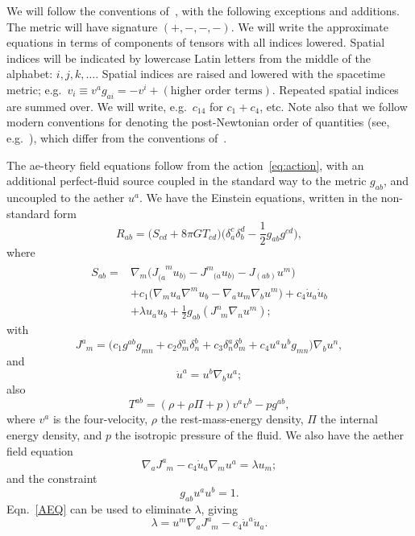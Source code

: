 \documentclass[aps,prd,preprint,amsmath,amssymb]{revtex4}
\def\beq{\begin{equation}}
\def\eeq{\end{equation}}
\def\ph{\phantom}
\def\half{\frac{1}{2}}
\begin{document}
We will follow the conventions of~\cite{wald}, with the following
exceptions and additions.  The metric will have signature 
$({+},{-},{-},{-})$.
We will write the approximate equations in terms of components of
tensors with all indices lowered. Spatial indices will be
indicated by lowercase Latin letters from the middle of the
alphabet: ${i,j,k,\dots}$.  Spatial indices are raised and lowered
with the spacetime metric; e.g.~$v_i \equiv v^a g_{ai} = -v^i +
(\text{higher order terms})$. Repeated spatial indices are summed
over.  We will write, e.g.~$c_{14}$ for $c_1 + c_4$, etc.  Note also 
that we follow modern conventions for denoting the post-Newtonian
order of quantities (see, e.g.~\cite{WillReview}), which differ from the 
conventions of~\cite{WillBook}.

The ae-theory field equations follow from the
action~\eqref{eq:action}, with an additional perfect-fluid source
coupled in the standard way to the metric $g_{ab}$, and uncoupled
to the aether $u^a$. We have the Einstein equations, written in
the non-standard form
%
\beq\label{EEQ}
    R_{ab} = \big(S_{cd} + 8\pi G T_{cd}\big)
            \big(\delta^c_a \delta^d_b - \half g_{ab}g^{cd}\big),
\eeq
%
where
%
\beq\begin{split}
    S_{ab} = &\nabla_m\bigl(J_{(a}^{\ph{(a}m}u_{b)} -
        J^m_{\ph{m}(a} u_{b)} - J_{(ab)}u^m\bigr)\\&
        +c_1\bigl(\nabla_m u_a\nabla^mu_b
            - \nabla_a u_m\nabla_b u^m\bigr)
        +c_4{\dot u}_a {\dot u}_b\\
        &+\lambda u_a u_b +\frac{1}{2}g_{ab}
            (J^n_{\ph{a}m}\nabla_n u^m);
\end{split}\eeq
%
with
%
\beq
    J^a_{\phantom{a}m} = \big(c_1g^{ab}g_{mn}
        +c_2\delta^a_m\delta^b_n + c_3\delta^a_n\delta^b_m
        +c_4 u^a u^b g_{mn}\big)
        \nabla_b u^n,
\eeq
%
and
%
\beq
    {\dot u}^a = u^b\nabla_b u^a;
\eeq
%
also
%
\beq
    T^{ab} = (\rho + \rho\Pi + p)v^a v^b - p g^{ab},
\eeq
%
where $v^a$ is the four-velocity, $\rho$ the rest-mass-energy
density, $\Pi$ the internal energy density, and $p$ the isotropic
pressure of the fluid.  We also have the aether field equation
%
\beq\label{AEQ}
    \nabla_a J^a_{\phantom{a}m}-c_4 {\dot u}_a \nabla_m u^a
        = \lambda u_m;
\eeq
%
and the constraint
%
\beq\label{CON}
    g_{ab}u^a u^b = 1.
\eeq
%
Eqn.~\eqref{AEQ} can be used to eliminate $\lambda$, giving
%
\beq
    \lambda = u^m\nabla_a J^a_{\phantom{a}m}
    - c_4{\dot u}^a{\dot u}_a.
\eeq
%
\end{document}
